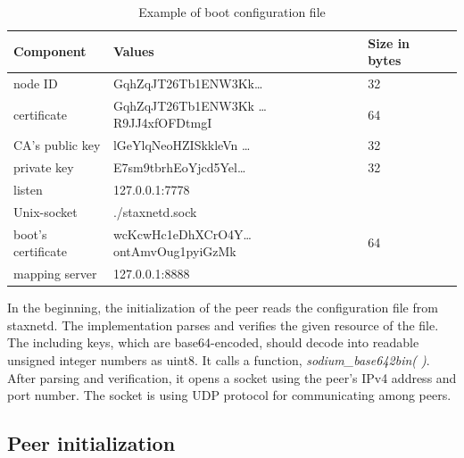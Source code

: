 \begin{table}[!ht]
	\small
	\centering
	\begin{tabular}{|l|l|l|l|}
		\hline
		Component & Values & Size in bytes \\
		\hline
		node ID & GqhZqJT26Tb1ENW3Kk… & 32 \\
		\hline
		certificate & GqhZqJT26Tb1ENW3Kk … R9JJ4xfOFDtmgI & 64 \\
		\hline
		CA’s public key & lGeYlqNeoHZISkkleVn … & 32 \\
		\hline
		private key & E7sm9tbrhEoYjcd5Yel… & 32 \\
		\hline
		listen & 127.0.0.1:7778 &  \\
		\hline
		Unix-socket & ./staxnetd.sock &  \\
		\hline
		boot’s certificate & wcKcwHc1eDhXCrO4Y… ontAmvOug1pyiGzMk & 64 \\
		\hline
		mapping server & 127.0.0.1:8888 & \\
		\hline
	\end{tabular}
	\caption{Example of boot configuration file}
\end{table}

In the beginning, the initialization of the peer reads the configuration file from staxnetd. The implementation parses and verifies the given resource of the file. The including keys, which are base64-encoded, should decode into readable unsigned integer numbers as uint8. It calls a function, \textit{sodium\_base642bin( )}. After parsing and verification, it opens a socket using the peer's IPv4 address and port number. The socket is using UDP protocol for communicating among peers.

\subsection{Peer initialization}

